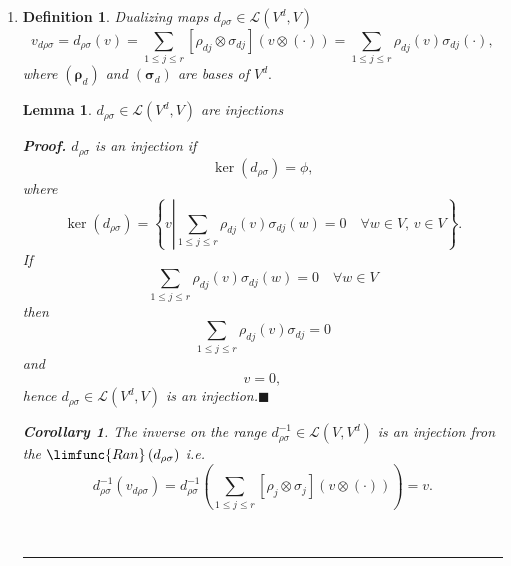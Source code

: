 \documentclass[aps,preprint]{revtex4}
\newtheorem{corollary}[theorem]{Corollary}
\newtheorem{definition}[theorem]{Definition}
\newtheorem{lemma}[theorem]{Lemma}
\newenvironment{proof}[1][Proof]{\noindent\textbf{#1.} }{\ \rule{0.5em}{0.5em}}
\begin{document}
\begin{enumerate}
\item 
\begin{definition}
Dualizing maps $d_{\rho \sigma }\in \mathcal{L}\left( V^{d},V\right) $%
\begin{equation}
v_{d\rho \sigma }=d_{\rho \sigma }\left( v\right) =\sum_{1\leq j\leq r}\left[
\rho _{dj}\otimes \sigma _{dj}\right] \left( v\otimes \left( \cdot \right)
\right) =\sum_{1\leq j\leq r}\rho _{dj}\left( v\right) \sigma _{dj}\left(
\cdot \right) ,
\end{equation}%
where $\left( \mathbf{\rho }_{d}\right) $ and $\left( \mathbf{\sigma }%
_{d}\right) $ are bases of $V^{d}.$
\end{definition}

\begin{lemma}
$d_{\rho \sigma }\in \mathcal{L}\left( V^{d},V\right) $ are injections

\begin{proof}
$d_{\rho \sigma }$ is an injection if 
\begin{equation}
\ker \left( d_{\rho \sigma }\right) =\phi ,
\end{equation}%
where%
\begin{equation}
\ker \left( d_{\rho \sigma }\right) =\left\{ v\left\vert \sum_{1\leq j\leq
r}\rho _{dj}\left( v\right) \sigma _{dj}\left( w\right) =0\quad \forall w\in
V,\,v\in V\right. \right\} .
\end{equation}%
If 
\begin{equation}
\sum_{1\leq j\leq r}\rho _{dj}\left( v\right) \sigma _{dj}\left( w\right)
=0\quad \forall w\in V
\end{equation}%
then 
\begin{equation}
\sum_{1\leq j\leq r}\rho _{dj}\left( v\right) \sigma _{dj}=0
\end{equation}%
and 
\begin{equation}
v=0,
\end{equation}%
hence $d_{\rho \sigma }\in \mathcal{L}\left( V^{d},V\right) $ is an
injection.$\blacksquare $

\begin{corollary}
The inverse on the range $d_{\rho \sigma }^{-1}\in \mathcal{L}\left(
V,V^{d}\right) $ is an injection fron the $\limfunc{Ran}\left( d_{\rho
\sigma }\right) $ i.e. 
\begin{equation}
d_{\rho \sigma }^{-1}\left( v_{d\rho \sigma }\right) =d_{\rho \sigma
}^{-1}\left( \sum_{1\leq j\leq r}\left[ \rho _{j}\otimes \sigma _{j}\right]
\left( v\otimes \left( \cdot \right) \right) \right) =v.
\end{equation}
\end{corollary}
\end{proof}
\end{lemma}


\end{enumerate}
\end{document}
